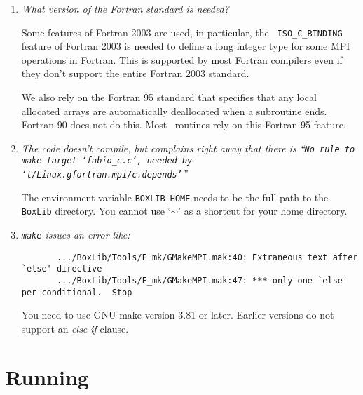 \begin{enumerate}

\item {\em What version of the Fortran standard is needed?}

  Some features of Fortran 2003 are used, in particular, the {\tt
    ISO\_C\_BINDING} feature of Fortran 2003 is needed to define a long
  integer type for some MPI operations in Fortran.  This is supported
  by most Fortran compilers even if they don't support the entire
  Fortran 2003 standard.

  We also rely on the Fortran 95 standard that specifies that any
  local allocated arrays are automatically deallocated when a
  subroutine ends.  Fortran 90 does not do this.  Most
  \maestro\ routines rely on this Fortran 95 feature.


\item {\em The code doesn't compile, but complains right away that there
   is ``{\tt No rule to make target `fabio\_c.c', needed by `t/Linux.gfortran.mpi/c.depends'}''}

   The environment variable {\tt BOXLIB\_HOME} needs to be the full path
   to the {\tt BoxLib} directory.  You cannot use `{\tt $\sim$}' as a shortcut
   for your home directory.
  
\item {\em {\tt make} issues an error like:
       {\small
       \begin{verbatim}
       .../BoxLib/Tools/F_mk/GMakeMPI.mak:40: Extraneous text after `else' directive
       .../BoxLib/Tools/F_mk/GMakeMPI.mak:47: *** only one `else' per conditional.  Stop
      \end{verbatim}
      }
      }

   You need to use GNU make version 3.81 or later.  Earlier versions do
   not support an {\em else-if} clause.

\end{enumerate}

\section{Running}

